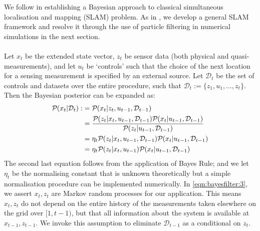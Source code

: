 We follow \cite{thrun2001probabilistic} in establishing a Bayesian approach to classical simultaneous localisation and mapping (SLAM) problem. As in \cite{thrun2001probabilistic}, we develop a general SLAM framework and resolve it through the use of particle filtering in numerical simulations in the next section. \\
\\
Let $x_t$ be the extended state vector, $z_t$ be sensor data (both physical and quasi-measurements), and let $u_t$ be `controls' such that the choice of the next location for a sensing measurement is specified by an external source. Let $\mathcal{D}_t$ be the set of controls and datasets over the entire procedure, such that $\mathcal{D}_t := \{z_1, u_1, \hdots, z_t \}$. Then the Bayesian posterior can be expanded as:
\begin{align}
\mathcal{P}_{} ( x_t | \mathcal{D}_t ) :&= \mathcal{P}_{} ( x_t | z_t, u_{t-1},\mathcal{D}_{t-1} ) \\
&= \frac{\mathcal{P}_{} ( z_t | x_t, u_{t-1}, \mathcal{D}_{t-1} ) \mathcal{P}_{} ( x_t| u_{t-1}, \mathcal{D}_{t-1} ) }{\mathcal{P}_{} (  z_t| u_{t-1}, \mathcal{D}_{t-1} )} \label{eqn:bayesfilter:1} \\
&= \eta_t\mathcal{P}_{} ( z_t | x_t, u_{t-1}, \mathcal{D}_{t-1} ) \mathcal{P}_{} ( x_t| u_{t-1}, \mathcal{D}_{t-1} ) \label{eqn:bayesfilter:2} \\
& = \eta_t\mathcal{P}_{} ( z_t | x_t, u_{t-1} ) \mathcal{P}_{} ( x_t| u_{t-1}, \mathcal{D}_{t-1} ) \label{eqn:bayesfilter:3} 
\end{align} The second last equation follows from the application of Bayes Rule; and we let $\eta_t$ be the normalising constant that is unknown theoretically but a simple normalisation procedure can be implemented numerically. In \cref{eqn:bayesfilter:3}, we assert $x_t, z_t$ are Markov random processes for our application. This means  $x_t, z_t$ do not depend on the entire history of the measurements taken elsewhere on the grid over $[1, t-1)$,  but that all information about the system is available at $x_{t-1}, z_{t-1}$. We invoke this assumption to eliminate $\mathcal{D}_{t-1}$ as a conditional on $z_t$.\\
\\
